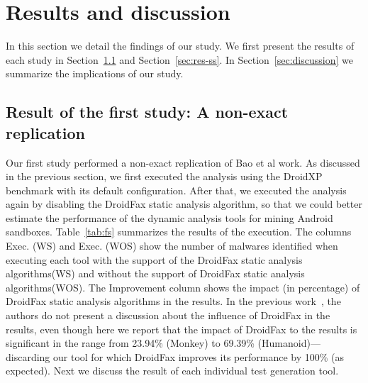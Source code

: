 \section{Results and discussion}

In this section we detail the findings of our study. We first present the results of each study
in Section~\ref{sec:res-fs} and Section~\ref{sec:res-ss}. In Section~\ref{sec:discussion} we summarize the
implications of our study. 

\subsection{Result of the first study: A non-exact replication}\label{sec:res-fs}

Our first study performed a non-exact replication of Bao et al work.
As discussed in the previous section, we first executed the analysis using the DroidXP benchmark with its default configuration. After that, we executed the analysis again by disabling the DroidFax static analysis algorithm, so that we could better estimate the performance of the dynamic analysis tools for mining Android sandboxes. Table~\ref{tab:fs} summarizes the results of the execution. The columns Exec. (WS) and Exec. (WOS) 
show the number of malwares identified when executing each tool with the
support of the DroidFax static analysis algorithms(WS) and without the support
of DroidFax static analysis algorithms(WOS). The Improvement column shows the impact
(in percentage) of DroidFax static analysis algorithms in the results.
In the previous work~\cite{}, the authors do not present a
discussion about the influence of DroidFax in the results, even
though here we report that the impact of DroidFax to the results is significant in the
range from 23.94\% (Monkey) to 69.39\% (Humanoid)---discarding our
\joke tool for which DroidFax improves its performance by 100\% (as expected).
Next we discuss the result of each individual test generation tool. 

